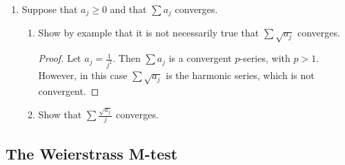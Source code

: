 \documentclass{article}
\begin{document}
\begin{enumerate}
\begin{proof}
                  there exists some $J$ for each $\varepsilon$ so that
                  $\sum_{j=J}^\infty \lvert a_j\rvert < \varepsilon$. Without loss of generality,
                  we can assume that $\varepsilon<1$. Then for all $j>J$, $a_j<1$. This
                  tells us that for all $j>J$ $a_j^2<a_j$, and thus
                  $\sum_{j=J}^\infty a_j^2 < \sum_{j=J}^\infty \lvert a_j\rvert < \varepsilon$.
                  Therefore, $\sum a_j^2$ converges.
            \end{proof}
      \item Suppose that $a_j\geq 0$ and that $\sum a_j$ converges.
            \begin{enumerate}
                  \item Show by example that it is not necessarily true that
                        $\sum\sqrt{a_j}$ converges.
                        \begin{proof}
                              Let $a_j=\frac{1}{j^2}$. Then $\sum a_j$ is a convergent
                              $p$-series, with $p>1$. However, in this case
                              $\sum\sqrt{a_j}$ is the harmonic series, which is not
                              convergent.
                        \end{proof}
                  \item Show that $\sum\frac{\sqrt{a_j}}{j}$ converges.
            \end{enumerate}
\end{enumerate}

\subsection{The Weierstrass M-test}
\end{document}
